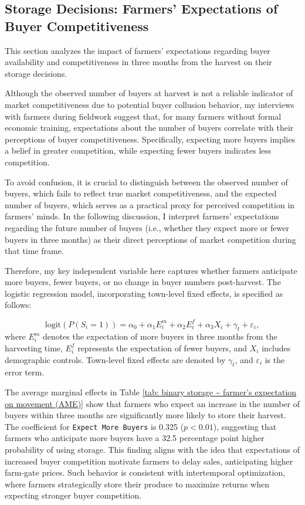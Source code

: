 \subsection{Storage Decisions: Farmers' Expectations of Buyer Competitiveness}

\noindent This section analyzes the impact of farmers' expectations regarding buyer availability and competitiveness in three months from the harvest on their storage decisions. 

Although the observed number of buyers at harvest is not a reliable indicator of market competitiveness due to potential buyer collusion behavior, my interviews with farmers during fieldwork suggest that, for many farmers without formal economic training, expectations about the number of buyers correlate with their perceptions of buyer competitiveness. Specifically, expecting more buyers implies a belief in greater competition, while expecting fewer buyers indicates less competition.

To avoid confusion, it is crucial to distinguish between the observed number of buyers, which fails to reflect true market competitiveness, and the expected number of buyers, which serves as a practical proxy for perceived competition in farmers' minds. In the following discussion, I interpret farmers' expectations regarding the future number of buyers (i.e., whether they expect more or fewer buyers in three months) as their direct perceptions of market competition during that time frame.

Therefore, my key independent variable here captures whether farmers anticipate more buyers, fewer buyers, or no change in buyer numbers post-harvest. The logistic regression model, incorporating town-level fixed effects, is specified as follows:

\begin{equation}
    \text{logit} \left( P(S_i = 1) \right) = \alpha_0 + \alpha_1 E^m_i + \alpha_2 E^f_i + \alpha_3 X_i + \gamma_t + \varepsilon_i,
\end{equation}
where $E^m_i$ denotes the expectation of more buyers in three months from the harvesting time, $E^f_i$ represents the expectation of fewer buyers, and $X_i$ includes demographic controls. Town-level fixed effects are denoted by $\gamma_t$, and $\varepsilon_i$ is the error term.





The average marginal effects in Table \ref{tab: binary storage ~ farmer's expectation on movement (AME)} show that farmers who expect an increase in the number of buyers within three months are significantly more likely to store their harvest. The coefficient for \texttt{Expect More Buyers} is 0.325 (\(p < 0.01\)), suggesting that farmers who anticipate more buyers have a 32.5 percentage point higher probability of using storage. This finding aligns with the idea that expectations of increased buyer competition motivate farmers to delay sales, anticipating higher farm-gate prices. Such behavior is consistent with intertemporal optimization, where farmers strategically store their produce to maximize returns when expecting stronger buyer competition.  

